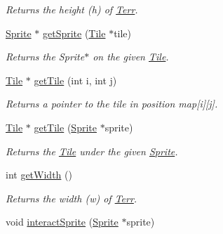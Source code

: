 \begin{DoxyCompactItemize}
\begin{DoxyCompactList}\small\item\em Returns the height (h) of \hyperlink{class_terr}{Terr}. \end{DoxyCompactList}\item 
\hyperlink{class_sprite}{Sprite} $\ast$ \hyperlink{class_terr_a556536114490c30cfa5b8c51bcd5c4a0}{get\+Sprite} (\hyperlink{class_tile}{Tile} $\ast$tile)\hypertarget{class_terr_a556536114490c30cfa5b8c51bcd5c4a0}{}\label{class_terr_a556536114490c30cfa5b8c51bcd5c4a0}

\begin{DoxyCompactList}\small\item\em Returns the Sprite$\ast$ on the given \hyperlink{class_tile}{Tile}. \end{DoxyCompactList}\item 
\hyperlink{class_tile}{Tile} $\ast$ \hyperlink{class_terr_a1ca3548cb10880ae8ac01362d1f3116a}{get\+Tile} (int i, int j)\hypertarget{class_terr_a1ca3548cb10880ae8ac01362d1f3116a}{}\label{class_terr_a1ca3548cb10880ae8ac01362d1f3116a}

\begin{DoxyCompactList}\small\item\em Returns a pointer to the tile in position map\mbox{[}i\mbox{]}\mbox{[}j\mbox{]}. \end{DoxyCompactList}\item 
\hyperlink{class_tile}{Tile} $\ast$ \hyperlink{class_terr_a31e8adf3ea4f593e0add333c3160942f}{get\+Tile} (\hyperlink{class_sprite}{Sprite} $\ast$sprite)\hypertarget{class_terr_a31e8adf3ea4f593e0add333c3160942f}{}\label{class_terr_a31e8adf3ea4f593e0add333c3160942f}

\begin{DoxyCompactList}\small\item\em Returns the \hyperlink{class_tile}{Tile} under the given \hyperlink{class_sprite}{Sprite}. \end{DoxyCompactList}\item 
int \hyperlink{class_terr_a397fdbbeb3fe3eb8989d9da77af42f57}{get\+Width} ()\hypertarget{class_terr_a397fdbbeb3fe3eb8989d9da77af42f57}{}\label{class_terr_a397fdbbeb3fe3eb8989d9da77af42f57}

\begin{DoxyCompactList}\small\item\em Returns the width (w) of \hyperlink{class_terr}{Terr}. \end{DoxyCompactList}\item 
void \hyperlink{class_terr_a8e248d8aa2c992345bce55c6ad7d10ff}{interact\+Sprite} (\hyperlink{class_sprite}{Sprite} $\ast$sprite)\hypertarget{class_terr_a8e248d8aa2c992345bce55c6ad7d10ff}{}\label{class_terr_a8e248d8aa2c992345bce55c6ad7d10ff}


\end{DoxyCompactItemize}

